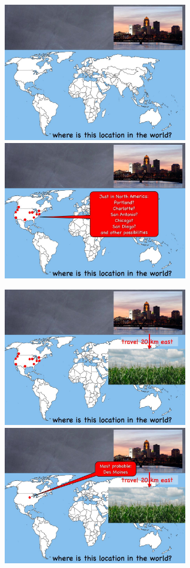 \begin{figure}
\centerline{
\mbox{\includegraphics[width=3.20in]{figures/8_loc8.jpg}}
\mbox{\includegraphics[width=3.20in]{figures/8_loc9.jpg}}
}
\end{figure}

\begin{figure}
\centerline{
\mbox{\includegraphics[width=3.20in]{figures/8_loc10.jpg}}
\mbox{\includegraphics[width=3.20in]{figures/8_loc11.jpg}}
}
\end{figure}


